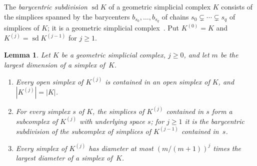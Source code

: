 \documentclass[11pt]{article}
\newtheorem{lemma}[theorem]{Lemma}
\theoremstyle{definition}
\numberwithin{equation}{section}
\begin{document}
The \emph{barycentric subdivision} $\operatorname{sd}K$ of a geometric simplicial complex $K$ consists of the simplices spanned by the barycenters $b_{s_0},\ldots,b_{s_q}$ of chains $s_0\subsetneq\cdots\subsetneq s_q$ of simplices of $K$; it is a geometric simplicial complex~\cite[p.~51]{Coste}. Put $K^{(0)}=K$ and $K^{(j)}=\operatorname{sd}K^{(j-1)}$ for $j\ge1$.

\begin{lemma}\label{lem:sd}
Let $K$ be a geometric simplicial complex, $j\ge0$, and let $m$ be the largest dimension of a simplex of~$K$.
\begin{enumerate}[label=\textup{(\alph*)}]
\item Every open simplex of $K^{(j)}$ is contained in an open simplex of $K$, and $|K^{(j)}|=|K|$.
\item For every simplex $s$ of $K$, the simplices of $K^{(j)}$ contained in $s$ form a subcomplex of $K^{(j)}$ with underlying space $s$; for $j\ge1$ it is the barycentric subdivision of the subcomplex of simplices of $K^{(j-1)}$ contained in~$s$.
\item Every simplex of $K^{(j)}$ has diameter at most $(m/(m+1))^j$ times the largest diameter of a simplex of~$K$.
\end{enumerate}
\end{lemma}
\end{document}
